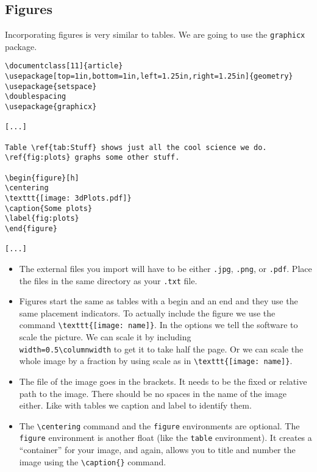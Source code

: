 \subsection{Figures}

Incorporating figures is very similar to tables. We are going to use the \texttt{graphicx} package.

\begin{lstlisting}
\documentclass[11]{article}
\usepackage[top=1in,bottom=1in,left=1.25in,right=1.25in]{geometry}
\usepackage{setspace}
\doublespacing
\usepackage{graphicx}

[...]

Table \ref{tab:Stuff} shows just all the cool science we do. \ref{fig:plots} graphs some other stuff.

\begin{figure}[h]
\centering
\texttt{[image: 3dPlots.pdf]}
\caption{Some plots}
\label{fig:plots}
\end{figure}

[...]
\end{lstlisting}

\begin{itemize}

\item The external files you import will have to be either \texttt{.jpg}, \texttt{.png}, or \texttt{.pdf}. Place the files in the same directory as your \texttt{.txt} file.

\item Figures start the same as tables with a begin and
an end and they use the same placement indicators. To actually include the figure we use the command \verb|\texttt{[image: name]}|. In the options we tell the software to scale the picture. We can scale it by including \\ \verb|width=0.5\columnwidth| to get it to take half the page. Or we can scale the whole image by a fraction by using scale as in \verb|\texttt{[image: name]}|. 

\item The file of the image goes in the brackets. It needs to be the fixed or relative path to the image. There should
be no spaces in the name of the image either. Like with tables we caption and label to identify them.

\item The \verb|\centering| command and the \texttt{figure} environments are optional. The \texttt{figure} environment is another float (like the \texttt{table} environment). It creates a ``container'' for your image, and again, allows you to title and number the image using the \verb|\caption{}| command.

\end{itemize}


